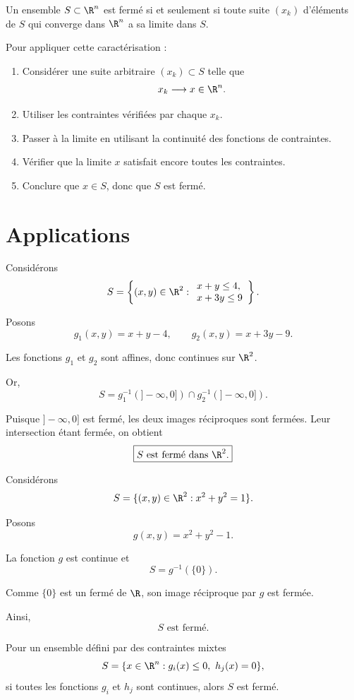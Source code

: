 \begin{methode}
Un ensemble $S\subset\R^n$ est fermé si et seulement si toute suite $(x_k)$ d'éléments de $S$ qui converge dans $\R^n$ a sa limite dans $S$.

Pour appliquer cette caractérisation :
\begin{enumerate}[label=\textbf{Étape \arabic*.}]
    \item Considérer une suite arbitraire $(x_k)\subset S$ telle que
    \[
    x_k\longrightarrow x\in\R^n.
    \]
    \item Utiliser les contraintes vérifiées par chaque $x_k$.
    \item Passer à la limite en utilisant la continuité des fonctions de contraintes.
    \item Vérifier que la limite $x$ satisfait encore toutes les contraintes.
    \item Conclure que $x\in S$, donc que $S$ est fermé.
\end{enumerate}
\end{methode}

\section{Applications}

\begin{exemple}
Considérons
\[
S=\left\{(x,y)\in\R^2:
\begin{array}{l}
x+y\leq 4,\\
x+3y\leq 9
\end{array}\right\}.
\]

Posons
\[
g_1(x,y)=x+y-4,\qquad
g_2(x,y)=x+3y-9.
\]

Les fonctions $g_1$ et $g_2$ sont affines, donc continues sur $\R^2$.

Or,
\[
S=g_1^{-1}(]-\infty,0])
\cap g_2^{-1}(]-\infty,0]).
\]

Puisque $]-\infty,0]$ est fermé, les deux images réciproques sont fermées. Leur intersection étant fermée, on obtient
\[
\boxed{S\text{ est fermé dans }\R^2.}
\]
\end{exemple}

\begin{exemple}
Considérons
\[
S=\{(x,y)\in\R^2:x^2+y^2=1\}.
\]

Posons
\[
g(x,y)=x^2+y^2-1.
\]

La fonction $g$ est continue et
\[
S=g^{-1}(\{0\}).
\]

Comme $\{0\}$ est un fermé de $\R$, son image réciproque par $g$ est fermée.

Ainsi,
\[
\boxed{S\text{ est fermé}.}
\]
\end{exemple}

\begin{attention}
Pour un ensemble défini par des contraintes mixtes
\[
S=\{x\in\R^n:g_i(x)\leq0,\ h_j(x)=0\},
\]
si toutes les fonctions $g_i$ et $h_j$ sont continues, alors $S$ est fermé.
\end{attention}
